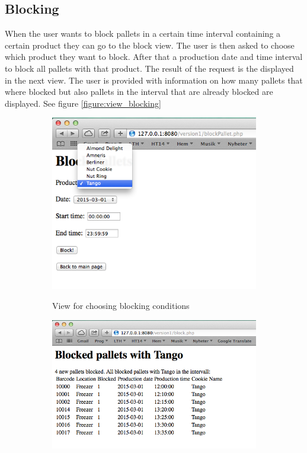 \documentclass[a4paper]{scrartcl}
\numberwithin{equation}{section}
\begin{document}
\subsection*{Blocking}

When the user wants to block pallets in a certain time interval containing a certain product they can go to the block view. The user is then asked to choose which product they want to block. After that a production date and time interval to block all pallets with that product. The result of the request is the displayed in the next view. The user is provided with information on how many pallets that where blocked but also pallets in the interval that are already blocked are displayed. See figure \ref{figure:view_blocking}

\begin{figure}[h!]
  \centering
  	\begin{subfigure}[b]{0.45\textwidth}
    	\includegraphics[width=\textwidth]{figures/view_block.png}
    	\label{figure:view_block}
    	\caption{View for choosing blocking conditions}
 		\end{subfigure}	
 		\begin{subfigure}[b]{0.45\textwidth}
    	\includegraphics[width=\textwidth]{figures/view_blockResult.png}

\end{subfigure}
\end{figure}
\end{document}
